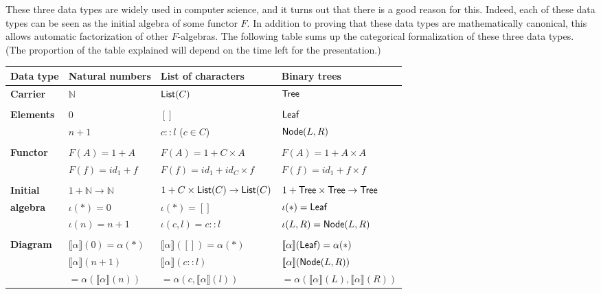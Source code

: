 \documentclass[11pt,a4paper]{article}
\newcommand{\gr}{\textbf}
\newcommand{\N}{\mathbb{N}}
\newcommand{\lb}{\llbracket}
\newcommand{\rb}{\rrbracket}
\newcommand{\info}[1]{\text{{\fontfamily{lmss}\selectfont #1}}}
\newcommand{\List}{\info{List}}
\newcommand{\Tree}{\info{Tree}}
\newcommand{\1}{\mathbbm{1}}
\newcommand{\Leaf}{\info{Leaf}}
\newcommand{\Node}{\info{Node}}
\begin{document}
These three data types are widely used in computer science, and it turns out that there is a good reason for this. Indeed, each of these data types can be seen as the initial algebra of some functor $F$. In addition to proving that these data types are mathematically canonical, this allows automatic factorization of other $F$-algebras.\newpage
The following table sums up the categorical formalization of these three data types.\\
(The proportion of the table explained will depend on the time left for the presentation.)
\begin{center}
\begin{tabular}{|l|l|l|l|}
  \hline
  \gr{Data type} & Natural numbers & List of characters & Binary trees \\
  \hline
  \gr{Carrier} & $\N$ & $\List(C)$ & $\Tree$ \\
  & & & \\
  \gr{Elements} & $0$ & $[]$ & $\Leaf$ \\
  & $n+1$ & $c::l$ ($c \in C$) & $\Node(L,R)$ \\
  & & & \\
  \gr{Functor} & $F(A) = 1 + A$ & $F(A) = 1 + C \times A$ & $F(A) = 1 + A \times A$ \\
  & $F(f) = id_1 + f$ & $F(f) = id_1 + id_C \times f$ & $F(f) = id_1 + f \times f$ \\
  & & & \\
  \gr{Initial} & $1 + \N \to \N$ & $1 + C \times \List(C) \to \List(C)$ & $1 + \Tree \times \Tree \to \Tree$ \\
  \gr{algebra} & $\iota(*) = 0$ & $\iota(*) = []$ & $\iota(*) = \Leaf$ \\
  & $\iota(n) = n+1$ & $\iota(c,l) = c::l$ & $\iota(L,R) = \Node(L,R)$ \\
  & & & \\
  \gr{Diagram} & $\lb \alpha \rb(0) = \alpha(*)$ & $\lb \alpha \rb([]) = \alpha(*)$ & $\lb \alpha \rb(\Leaf) = \alpha(*)$ \\
  & $\lb \alpha \rb(n+1) $ & $\lb \alpha \rb (c::l)  $ & $\lb \alpha \rb (\Node(L,R)) $ \\
  & $ = \alpha(\lb \alpha \rb(n))$ & $= \alpha(c,\lb \alpha \rb(l))$ & $= \alpha (\lb \alpha \rb (L) , \lb \alpha \rb (R))$ \\
  \hline
\end{tabular}
\end{center}
\end{document}
